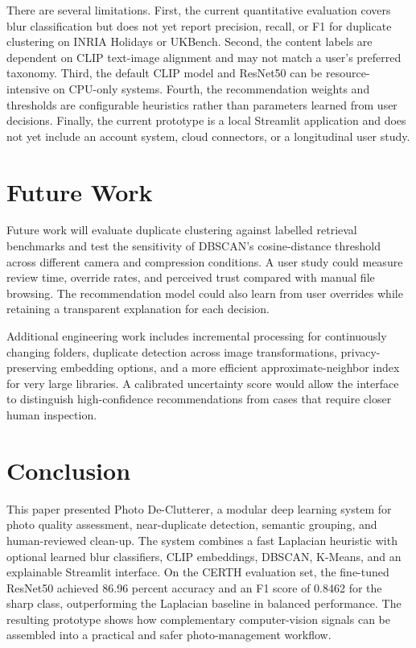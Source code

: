 \documentclass[conference]{IEEEtran}
\newcommand{\project}{Photo De-Clutterer}
\begin{document}
There are several limitations. First, the current quantitative evaluation covers blur classification but does not yet report precision, recall, or F1 for duplicate clustering on INRIA Holidays or UKBench. Second, the content labels are dependent on CLIP text-image alignment and may not match a user's preferred taxonomy. Third, the default CLIP model and ResNet50 can be resource-intensive on CPU-only systems. Fourth, the recommendation weights and thresholds are configurable heuristics rather than parameters learned from user decisions. Finally, the current prototype is a local Streamlit application and does not yet include an account system, cloud connectors, or a longitudinal user study.

\section{Future Work}
Future work will evaluate duplicate clustering against labelled retrieval benchmarks and test the sensitivity of DBSCAN's cosine-distance threshold across different camera and compression conditions. A user study could measure review time, override rates, and perceived trust compared with manual file browsing. The recommendation model could also learn from user overrides while retaining a transparent explanation for each decision.

Additional engineering work includes incremental processing for continuously changing folders, duplicate detection across image transformations, privacy-preserving embedding options, and a more efficient approximate-neighbor index for very large libraries. A calibrated uncertainty score would allow the interface to distinguish high-confidence recommendations from cases that require closer human inspection.

\section{Conclusion}
This paper presented \project{}, a modular deep learning system for photo quality assessment, near-duplicate detection, semantic grouping, and human-reviewed clean-up. The system combines a fast Laplacian heuristic with optional learned blur classifiers, CLIP embeddings, DBSCAN, K-Means, and an explainable Streamlit interface. On the CERTH evaluation set, the fine-tuned ResNet50 achieved 86.96 percent accuracy and an F1 score of 0.8462 for the sharp class, outperforming the Laplacian baseline in balanced performance. The resulting prototype shows how complementary computer-vision signals can be assembled into a practical and safer photo-management workflow.
\end{document}

